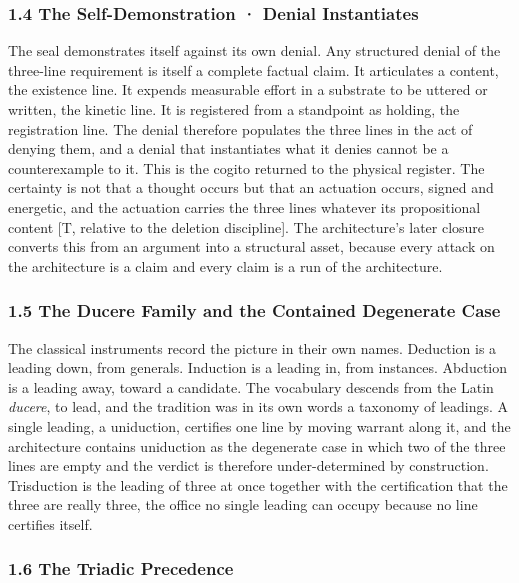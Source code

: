 \documentclass[10pt,twocolumn]{article}
\begin{document}
\hypertarget{the-self-demonstration-denial-instantiates}{%
\subsubsection{1.4 The Self-Demonstration · Denial
Instantiates}\label{the-self-demonstration-denial-instantiates}}

The seal demonstrates itself against its own denial. Any structured
denial of the three-line requirement is itself a complete factual claim.
It articulates a content, the existence line. It expends measurable
effort in a substrate to be uttered or written, the kinetic line. It is
registered from a standpoint as holding, the registration line. The
denial therefore populates the three lines in the act of denying them,
and a denial that instantiates what it denies cannot be a counterexample
to it. This is the cogito returned to the physical register. The
certainty is not that a thought occurs but that an actuation occurs,
signed and energetic, and the actuation carries the three lines whatever
its propositional content {[}T, relative to the deletion discipline{]}.
The architecture's later closure converts this from an argument into a
structural asset, because every attack on the architecture is a claim
and every claim is a run of the architecture.

\hypertarget{the-ducere-family-and-the-contained-degenerate-case}{%
\subsubsection{1.5 The Ducere Family and the Contained Degenerate
Case}\label{the-ducere-family-and-the-contained-degenerate-case}}

The classical instruments record the picture in their own names.
Deduction is a leading down, from generals. Induction is a leading in,
from instances. Abduction is a leading away, toward a candidate. The
vocabulary descends from the Latin \emph{ducere}, to lead, and the
tradition was in its own words a taxonomy of leadings. A single leading,
a uniduction, certifies one line by moving warrant along it, and the
architecture contains uniduction as the degenerate case in which two of
the three lines are empty and the verdict is therefore under-determined
by construction. Trisduction is the leading of three at once together
with the certification that the three are really three, the office no
single leading can occupy because no line certifies itself.

\hypertarget{the-triadic-precedence}{%
\subsubsection{1.6 The Triadic
Precedence}\label{the-triadic-precedence}}
\end{document}
